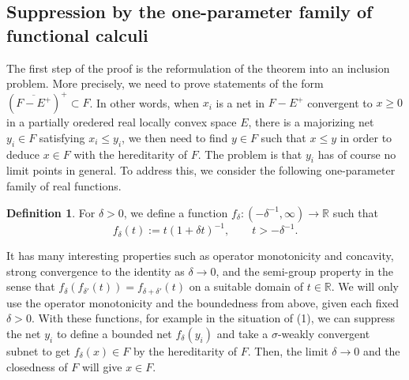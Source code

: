 \documentclass{CUP-JNL-FMP}
\theoremstyle{plain}
\theoremstyle{definition}
\newtheorem{definition}[theorem]{Definition}
\begin{document}
\subsection{Suppression by the one-parameter family of functional calculi}

The first step of the proof is the reformulation of the theorem into an inclusion problem.
More precisely, we need to prove statements of the form $(\overline{F-E^+})^+\subset F$.
In other words, when $x_i$ is a net in $F-E^+$ convergent to $x\ge0$ in a partially oredered real locally convex space $E$, there is a majorizing net $y_i\in F$ satisfying $x_i\le y_i$, we then need to find $y\in F$ such that $x\le y$ in order to deduce $x\in F$ with the hereditarity of $F$.
The problem is that $y_i$ has of course no limit points in general.
To address this, we consider the following one-parameter family of real functions.
\begin{definition}
For $\delta>0$, we define a function $f_\delta:(-\delta^{-1},\infty)\to\mathbb{R}$ such that
\[f_\delta(t):=t(1+\delta t)^{-1},\qquad t>-\delta^{-1}.\]
\end{definition}
It has many interesting properties such as operator monotonicity and concavity, strong convergence to the identity as $\delta\to0$, and the semi-group property in the sense that $f_\delta(f_{\delta'}(t))=f_{\delta+\delta'}(t)$ on a suitable domain of $t\in\mathbb{R}$.
We will only use the operator monotonicity and the boundedness from above, given each fixed $\delta>0$.
With these functions, for example in the situation of (1), we can suppress the net $y_i$ to define a bounded net $f_\delta(y_i)$ and take a $\sigma$-weakly convergent subnet to get $f_\delta(x)\in F$ by the hereditarity of $F$.
Then, the limit $\delta\to0$ and the closedness of $F$ will give $x\in F$.
\end{document}
